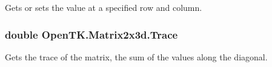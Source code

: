 Gets or sets the value at a specified row and column. 

\hypertarget{struct_open_t_k_1_1_matrix2x3d_adaf315ae9d7e66491c9ed7f815fb0bfb}{
\subsubsection[{Trace}]{\setlength{\rightskip}{0pt plus 5cm}double Open\-T\-K.\-Matrix2x3d.\-Trace\hspace{0.3cm}{\ttfamily [get]}}}\label{struct_open_t_k_1_1_matrix2x3d_adaf315ae9d7e66491c9ed7f815fb0bfb}


Gets the trace of the matrix, the sum of the values along the diagonal. 

